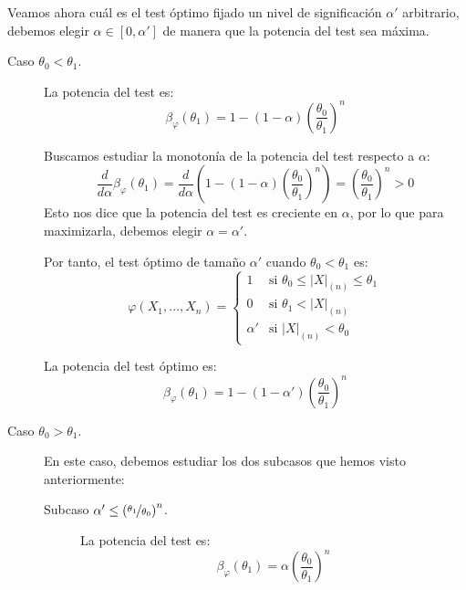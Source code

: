 \begin{ejercicio}
    Veamos ahora cuál es el test óptimo fijado un nivel de significación $\alpha'$ arbitrario, debemos elegir $\alpha\in \left[0,\alpha'\right]$ de manera que la potencia del test sea máxima.
    \begin{description}
        \item[Caso $\theta_0 < \theta_1$.] La potencia del test es:
        \begin{equation*}
            \beta_\varphi(\theta_1) = 1 - (1-\alpha)\left(\frac{\theta_0}{\theta_1}\right)^n
        \end{equation*}

        Buscamos estudiar la monotonía de la potencia del test respecto a $\alpha$:
        \begin{equation*}
            \frac{d}{d\alpha}\beta_\varphi(\theta_1) = \frac{d}{d\alpha}\left(1 - (1-\alpha)\left(\frac{\theta_0}{\theta_1}\right)^n\right) = \left(\frac{\theta_0}{\theta_1}\right)^n > 0
        \end{equation*}
        Esto nos dice que la potencia del test es creciente en $\alpha$, por lo que para maximizarla, debemos elegir $\alpha = \alpha'$.

        Por tanto, el test óptimo de tamaño $\alpha'$ cuando $\theta_0 < \theta_1$ es:
        \begin{equation*}
            \varphi(X_1, \ldots, X_n) = \left\{\begin{array}{ll}
                1 & \text{si\ } \theta_0 \leq |X|_{(n)} \leq \theta_1 \\
                0 & \text{si\ } \theta_1 < |X|_{(n)} \\
                \alpha' & \text{si\ } |X|_{(n)} < \theta_0
            \end{array}\right.
        \end{equation*}

        La potencia del test óptimo es:
        \begin{equation*}
            \beta_\varphi(\theta_1) = 1 - (1-\alpha')\left(\frac{\theta_0}{\theta_1}\right)^n
        \end{equation*}

        \item[Caso $\theta_0 > \theta_1$.] En este caso, debemos estudiar los dos subcasos que hemos visto anteriormente:
        \begin{description}
            \item[Subcaso $\alpha'\leq \left(\nicefrac{\theta_1}{\theta_0}\right)^n$.] La potencia del test es:
            \begin{equation*}
                \beta_\varphi(\theta_1) = \alpha\left(\frac{\theta_0}{\theta_1}\right)^n
            \end{equation*}


\end{description}
\end{description}
\end{ejercicio}
